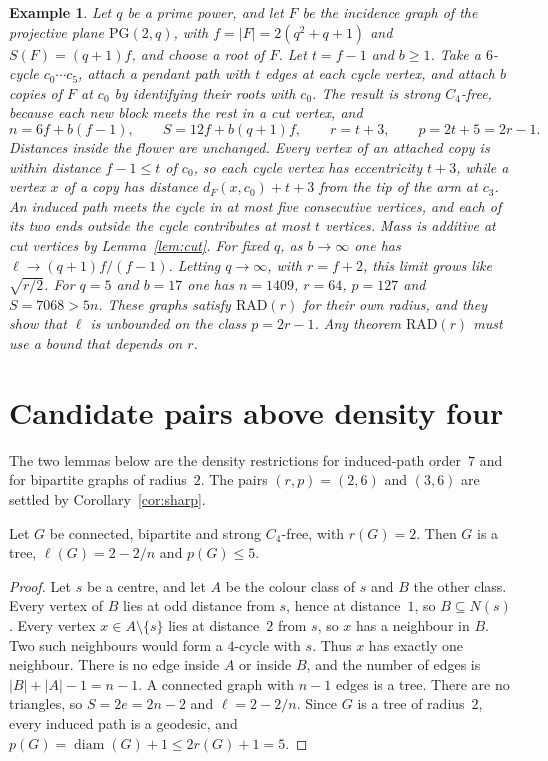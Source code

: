 \documentclass[ASNA]{USG}
\theoremstyle{WBstyletwo}
\newtheorem{example}[theorem]{Example}
\numberwithin{equation}{section}
\newcommand{\lr}{\ell}
\newcommand{\pp}{p}
\newcommand{\RAD}{\mathrm{RAD}}
\begin{document}
\begin{example}\label{ex:plane}
Let $q$ be a prime power, and let $F$ be the incidence graph of the projective plane $\mathrm{PG}(2,q)$, with $f=|F|=2(q^2+q+1)$ and $S(F)=(q+1)f$, and choose a root of $F$. Let $t=f-1$ and $b\ge 1$. Take a $6$-cycle $c_0\cdots c_5$, attach a pendant path with $t$ edges at each cycle vertex, and attach $b$ copies of $F$ at $c_0$ by identifying their roots with $c_0$. The result is strong $C_4$-free, because each new block meets the rest in a cut vertex, and
\[
n=6f+b(f-1),\qquad S=12f+b(q+1)f,\qquad r=t+3,\qquad \pp=2t+5=2r-1.
\]
Distances inside the flower are unchanged. Every vertex of an attached copy is within distance $f-1\le t$ of $c_0$, so each cycle vertex has eccentricity $t+3$, while a vertex $x$ of a copy has distance $d_F(x,c_0)+t+3$ from the tip of the arm at $c_3$. An induced path meets the cycle in at most five consecutive vertices, and each of its two ends outside the cycle contributes at most $t$ vertices. Mass is additive at cut vertices by Lemma~\ref{lem:cut}. For fixed $q$, as $b\to\infty$ one has $\lr\to(q+1)f/(f-1)$. Letting $q\to\infty$, with $r=f+2$, this limit grows like $\sqrt{r/2}$. For $q=5$ and $b=17$ one has $n=1409$, $r=64$, $\pp=127$ and $S=7068>5n$. These graphs satisfy $\RAD(r)$ for their own radius, and they show that $\lr$ is unbounded on the class $\pp=2r-1$. Any theorem $\RAD(r)$ must use a bound that depends on $r$.
\end{example}


\section{Candidate pairs above density four}\label{sec:high}

The two lemmas below are the density restrictions for induced-path order~$7$ and for bipartite graphs of radius~$2$. The pairs $(r,\pp)=(2,6)$ and $(3,6)$ are settled by Corollary~\ref{cor:sharp}.

\begin{lemma}\label{lem:rad2bip}
Let $G$ be connected, bipartite and strong $C_4$-free, with $r(G)=2$. Then $G$ is a tree, $\lr(G)=2-2/n$ and $\pp(G)\le 5$.
\end{lemma}

\begin{proof}
Let $s$ be a centre, and let $A$ be the colour class of $s$ and $B$ the other class. Every vertex of $B$ lies at odd distance from $s$, hence at distance~$1$, so $B\subseteq N(s)$. Every vertex $x\in A\setminus\{s\}$ lies at distance~$2$ from $s$, so $x$ has a neighbour in $B$. Two such neighbours would form a $4$-cycle with $s$. Thus $x$ has exactly one neighbour. There is no edge inside $A$ or inside $B$, and the number of edges is $|B|+|A|-1=n-1$. A connected graph with $n-1$ edges is a tree. There are no triangles, so $S=2e=2n-2$ and $\lr=2-2/n$. Since $G$ is a tree of radius~$2$, every induced path is a geodesic, and $\pp(G)=\operatorname{diam}(G)+1\le 2r(G)+1=5$.
\end{proof}
\end{document}
